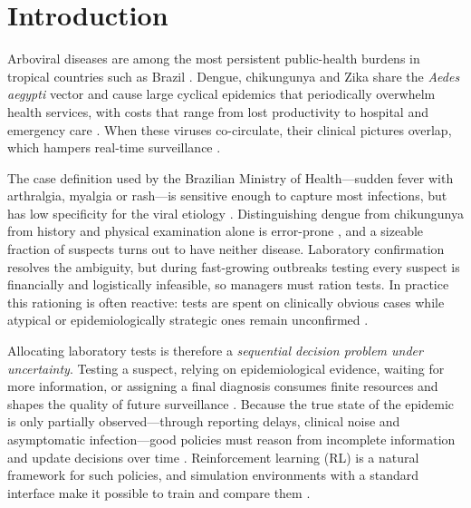 \documentclass[11pt,a4paper]{article}
\begin{document}
\begin{abstract}
\medskip
\noindent\textbf{Keywords:} reinforcement learning; credit assignment; arboviruses; diagnostic testing; resource allocation; transfer; epidemiological surveillance.
\end{abstract}

\section{Introduction}

Arboviral diseases are among the most persistent public-health burdens in tropical countries such as Brazil \cite{govbr_arboviroses}. Dengue, chikungunya and Zika share the \textit{Aedes aegypti} vector and cause large cyclical epidemics that periodically overwhelm health services, with costs that range from lost productivity to hospital and emergency care \cite{donateli_visualizacao_2023, ministério2024boletim}. When these viruses co-circulate, their clinical pictures overlap, which hampers real-time surveillance \cite{junior_epidemiology_2022}.

The case definition used by the Brazilian Ministry of Health---sudden fever with arthralgia, myalgia or rash---is sensitive enough to capture most infections, but has low specificity for the viral etiology \cite{govbr_chick}. Distinguishing dengue from chikungunya from history and physical examination alone is error-prone \cite{arrubla-hoyos_methodology_2024}, and a sizeable fraction of suspects turns out to have neither disease. Laboratory confirmation resolves the ambiguity, but during fast-growing outbreaks testing every suspect is financially and logistically infeasible, so managers must ration tests. In practice this rationing is often reactive: tests are spent on clinically obvious cases while atypical or epidemiologically strategic ones remain unconfirmed \cite{junior_epidemiology_2022}.

Allocating laboratory tests is therefore a \emph{sequential decision problem under uncertainty}. Testing a suspect, relying on epidemiological evidence, waiting for more information, or assigning a final diagnosis consumes finite resources and shapes the quality of future surveillance \cite{yu_deep_2023, yaesoubi_generalized_2011}. Because the true state of the epidemic is only partially observed---through reporting delays, clinical noise and asymptomatic infection---good policies must reason from incomplete information and update decisions over time \cite{yaesoubi_generalized_2011, sutton2018reinforcement}. Reinforcement learning (RL) is a natural framework for such policies, and simulation environments with a standard interface make it possible to train and compare them \cite{noauthor_gymnasium_nodate, lapan2020deep}.
\end{document}
